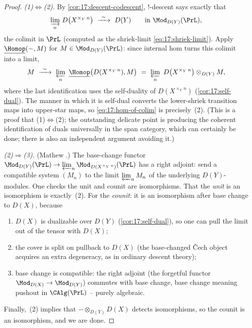 \begin{proof}
\emph{(1)$\Leftrightarrow$(2).} By \cref{cor:17:descent-codescent}, $!$-descent says exactly
that
\[
\varinjlim_{n}\,D\bigl(X^{\times_{Y}\,n}\bigr)\ \xrightarrow{\ \sim\ }\ D(Y)\qquad\text{in }\Mod_{D(Y)}(\PrL),
\]
the colimit in $\PrL$ (computed as the shriek-limit \eqref{eq:17:shriek-limit}). Apply
$\underline{\Homop}(-,M)$ for $M\in\Mod_{D(Y)}(\PrL)$: since internal hom turns this colimit
into a limit,
\begin{equation}
\label{eq:17:hom-of-colim}
M\ \xrightarrow{\ \sim\ }\ \varprojlim_{n}\ \underline{\Homop}\bigl(D(X^{\times_{Y}\,n}),M\bigr)
\ =\ \varprojlim_{n}\ D\bigl(X^{\times_{Y}\,n}\bigr)\otimes_{D(Y)}M,
\end{equation}
where the last identification uses the self-duality of $D(X^{\times_{Y}\,n})$
(\cref{cor:17:self-dual}). The manner in which it is self-dual converts the lower-shriek
transition maps into upper-star maps, so \eqref{eq:17:hom-of-colim} is precisely~(2). (This
is a proof that (1)$\Leftrightarrow$(2); the outstanding delicate point is producing the
coherent identification of duals universally in the span category, which can certainly be
done; there is also an independent argument avoiding it.)

\emph{(2)$\Rightarrow$(3).} (Mathew \cite{mathew2016galoisgroupstablehomotopy}.) The
base-change functor $\Mod_{D(Y)}(\PrL)\to\varprojlim_{n}\Mod_{D(X^{\times_{Y}\,n})}(\PrL)$
has a right adjoint: send a compatible system $(M_{n})$ to the limit $\varprojlim_{n}M_{n}$
of the underlying $D(Y)$-modules. One checks the unit and counit are isomorphisms. That the
\emph{unit} is an isomorphism is exactly~(2). For the \emph{counit}: it is an isomorphism
after base change to $D(X)$, because
\begin{enumerate}
\item[(i)] $D(X)$ is dualizable over $D(Y)$ (\cref{cor:17:self-dual}), so one can pull the
limit out of the tensor with $D(X)$;
\item[(ii)] the cover is split on pullback to $D(X)$ (the base-changed \v{C}ech object acquires
an extra degeneracy, as in ordinary descent theory);
\item[(iii)] base change is compatible: the right adjoint (the forgetful functor
$\Mod_{D(X)}\to\Mod_{D(Y)}$) commutes with base change, base change meaning pushout in
$\CAlg(\PrL)$ -- purely algebraic.
\end{enumerate}
Finally,~(2) implies that $-\otimes_{D(Y)}D(X)$ detects isomorphisms, so the counit is an
isomorphism, and we are done.


\end{proof}
